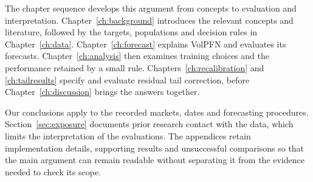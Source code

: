 The chapter sequence develops this argument from concepts to evaluation and interpretation. Chapter~\ref{ch:background} introduces the relevant concepts and literature, followed by the targets, populations and decision rules in Chapter~\ref{ch:data}. Chapter~\ref{ch:forecast} explains VolPFN and evaluates its forecasts. Chapter~\ref{ch:analysis} then examines training choices and the performance retained by a small rule. Chapters~\ref{ch:recalibration} and \ref{ch:tailresults} specify and evaluate residual tail correction, before Chapter~\ref{ch:discussion} brings the answers together.

Our conclusions apply to the recorded markets, dates and forecasting procedures. Section~\ref{sec:exposure} documents prior research contact with the data, which limits the interpretation of the evaluations. The appendices retain implementation details, supporting results and unsuccessful comparisons so that the main argument can remain readable without separating it from the evidence needed to check its scope.